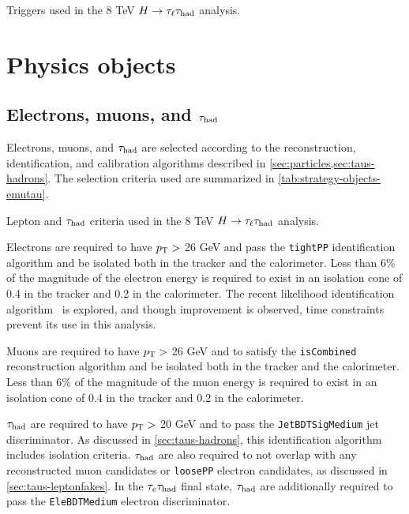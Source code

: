 \begin{table}[bp]
  \centering
  \renewcommand{\arraystretch}{1.4}
  \caption{Triggers used in the 8 TeV $H\rightarrow\tau_\ell\tau_\text{had}$ analysis.}
  
  \label{tab:strategy-triggers}
\end{table}

\section{Physics objects}
\label{sec:strategy-objects}

\subsection{Electrons, muons, and $\tau_\text{had}$}
\label{sec:strategy-leptons}

Electrons, muons, and $\tau_\text{had}$ are selected according to the reconstruction, identification, and calibration algorithms described in \cref{sec:particles,sec:taus-hadrons}. The selection criteria used are summarized in \cref{tab:strategy-objects-emutau}.

\begin{table}[bp]
  \centering
  \renewcommand{\arraystretch}{1.4}
  \caption{Lepton and $\tau_\text{had}$ criteria used in the 8 TeV $H\rightarrow\tau_\ell\tau_\text{had}$ analysis.}
  
  \label{tab:strategy-objects-emutau}
\end{table}

Electrons are required to have $p_{\mathrm{T}} >$ 26 GeV and pass the \texttt{tightPP} identification algorithm and be isolated both in the tracker and the calorimeter. Less than 6\% of the magnitude of the electron energy is required to exist in an isolation cone of 0.4 in the tracker and 0.2 in the calorimeter. The recent likelihood identification algorithm~\cite{ATLAS-CONF-2014-032} is explored, and though improvement is observed, time constraints prevent its use in this analysis.

Muons are required to have $p_{\mathrm{T}} >$ 26 GeV and to satisfy the \texttt{isCombined} reconstruction algorithm and be isolated both in the tracker and the calorimeter. Less than 6\% of the magnitude of the muon energy is required to exist in an isolation cone of 0.4 in the tracker and 0.2 in the calorimeter.

$\tau_\text{had}$ are required to have $p_{\mathrm{T}} >$ 20 GeV and to pass the \texttt{JetBDTSigMedium} jet discriminator. As discussed in \cref{sec:taus-hadrons}, this identification algorithm includes isolation criteria. $\tau_\text{had}$ are also required to not overlap with any reconstructed muon candidates or \texttt{loosePP} electron candidates, as discussed in \cref{sec:taus-leptonfakes}. In the $\tau_e \tau_\text{had}$ final state, $\tau_\text{had}$ are additionally required to pass the \texttt{EleBDTMedium} electron discriminator.


